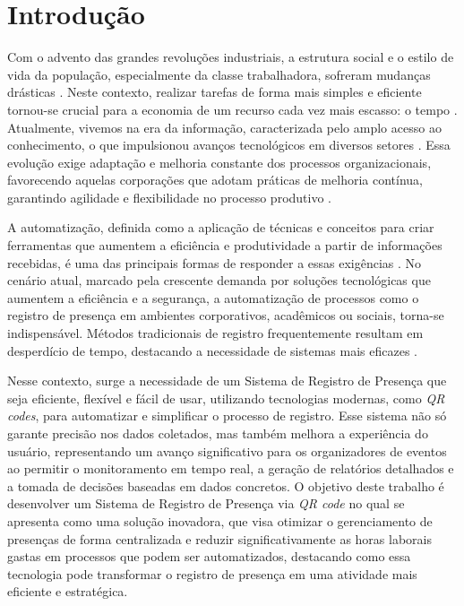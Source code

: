 \section{Introdução}
\label{sec:introducao}

Com o advento das grandes revoluções industriais, a estrutura social e o estilo de vida da população, especialmente da classe trabalhadora, sofreram mudanças drásticas \cite{hobsbawn2012}. Neste contexto, realizar tarefas de forma mais simples e eficiente tornou-se crucial para a economia de um recurso cada vez mais escasso: o tempo \cite{romera2023}. Atualmente, vivemos na era da informação, caracterizada pelo amplo acesso ao conhecimento, o que impulsionou avanços tecnológicos em diversos setores \cite{silva2019}. Essa evolução exige adaptação e melhoria constante dos processos organizacionais, favorecendo aquelas corporações que adotam práticas de melhoria contínua, garantindo agilidade e flexibilidade no processo produtivo \cite{goncalves2000}.

A automatização, definida como a aplicação de técnicas e conceitos para criar ferramentas que aumentem a eficiência e produtividade a partir de informações recebidas, é uma das principais formas de responder a essas exigências \cite{moraes2012}. No cenário atual, marcado pela crescente demanda por soluções tecnológicas que aumentem a eficiência e a segurança, a automatização de processos como o registro de presença em ambientes corporativos, acadêmicos ou sociais, torna-se indispensável. Métodos tradicionais de registro frequentemente resultam em desperdício de tempo, destacando a necessidade de sistemas mais eficazes \cite{romera2023}.

Nesse contexto, surge a necessidade de um Sistema de Registro de Presença que seja eficiente, flexível e fácil de usar, utilizando tecnologias modernas, como \textit{QR codes}, para automatizar e simplificar o processo de registro. Esse sistema não só garante precisão nos dados coletados, mas também melhora a experiência do usuário, representando um avanço significativo para os organizadores de eventos ao permitir o monitoramento em tempo real, a geração de relatórios detalhados e a tomada de decisões baseadas em dados concretos. O objetivo deste trabalho é desenvolver um Sistema de Registro de Presença via \textit{QR code} no qual se apresenta como uma solução inovadora, que visa otimizar o gerenciamento de presenças de forma centralizada e reduzir significativamente as horas laborais gastas em processos que podem ser automatizados, destacando como essa tecnologia pode transformar o registro de presença em uma atividade mais eficiente e estratégica.

